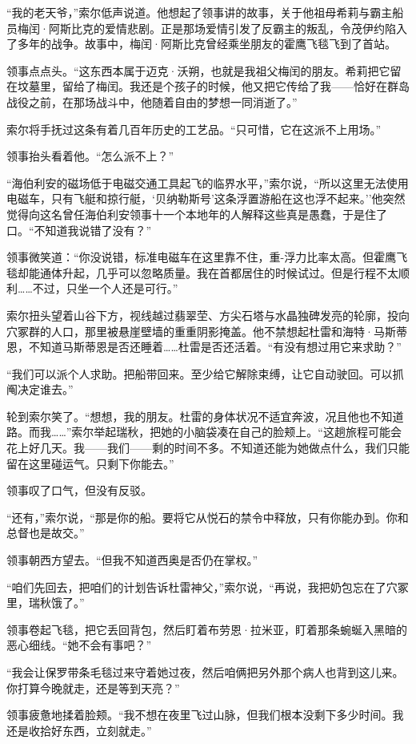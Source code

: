 \documentclass[AutoFakeBold=true]{book}
\begin{document}
``我的老天爷，''索尔低声说道。他想起了领事讲的故事，关于他祖母希莉与霸主船员梅闰·阿斯比克的爱情悲剧。正是那场爱情引发了反霸主的叛乱，令茂伊约陷入了多年的战争。故事中，梅闰·阿斯比克曾经乘坐朋友的霍鹰飞毯飞到了首站。

领事点点头。``这东西本属于迈克·沃朔，也就是我祖父梅闰的朋友。希莉把它留在坟墓里，留给了梅闰。我还是个孩子的时候，他又把它传给了我——恰好在群岛战役之前，在那场战斗中，他随着自由的梦想一同消逝了。''

索尔将手抚过这条有着几百年历史的工艺品。``只可惜，它在这派不上用场。''

领事抬头看着他。``怎么派不上？''

``海伯利安的磁场低于电磁交通工具起飞的临界水平，''索尔说，``所以这里无法使用电磁车，只有飞艇和掠行艇，`贝纳勒斯号'这条浮置游船在这也浮不起来。''他突然觉得向这名曾任海伯利安领事十一个本地年的人解释这些真是愚蠢，于是住了口。``不知道我说错了没有？''

领事微笑道：``你没说错，标准电磁车在这里靠不住，重-浮力比率太高。但霍鹰飞毯却能通体升起，几乎可以忽略质量。我在首都居住的时候试过。但是行程不太顺利……不过，只坐一个人还是可行。''

索尔扭头望着山谷下方，视线越过翡翠茔、方尖石塔与水晶独碑发亮的轮廓，投向穴冢群的人口，那里被悬崖壁墙的重重阴影掩盖。他不禁想起杜雷和海特·马斯蒂恩，不知道马斯蒂恩是否还睡着……杜雷是否还活着。``有没有想过用它来求助？''

``我们可以派个人求助。把船带回来。至少给它解除束缚，让它自动驶回。可以抓阄决定谁去。''

轮到索尔笑了。``想想，我的朋友。杜雷的身体状况不适宜奔波，况且他也不知道路。而我……''索尔举起瑞秋，把她的小脑袋凑在自己的脸颊上。``这趟旅程可能会花上好几天。我——我们——剩的时间不多。不知道还能为她做点什么，我们只能留在这里碰运气。只剩下你能去。''

领事叹了口气，但没有反驳。

``还有，''索尔说，``那是你的船。要将它从悦石的禁令中释放，只有你能办到。你和总督也是故交。''

领事朝西方望去。``但我不知道西奥是否仍在掌权。''

``咱们先回去，把咱们的计划告诉杜雷神父，''索尔说，``再说，我把奶包忘在了穴冢里，瑞秋饿了。''

领事卷起飞毯，把它丢回背包，然后盯着布劳恩·拉米亚，盯着那条蜿蜒入黑暗的恶心细线。``她不会有事吧？''

``我会让保罗带条毛毯过来守着她过夜，然后咱俩把另外那个病人也背到这儿来。你打算今晚就走，还是等到天亮？''

领事疲惫地揉着脸颊。``我不想在夜里飞过山脉，但我们根本没剩下多少时间。我还是收拾好东西，立刻就走。''
\end{document}
